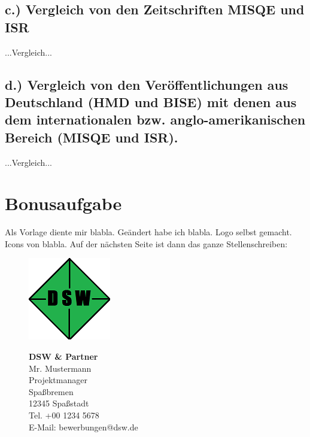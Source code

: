 \documentclass[12pt,utf8]{scrartcl}
\begin{document}
\begin{flushleft}
\subsection{\label{sub3:einfuehrung}c.) Vergleich von den Zeitschriften MISQE und ISR}

...Vergleich...

\subsection{\label{sub4:einfuehrung}d.) Vergleich von den Veröffentlichungen aus Deutschland (HMD und BISE) mit denen aus dem internationalen bzw. anglo-amerikanischen Bereich (MISQE und ISR).}

...Vergleich...

\section{\label{sec:bonus}Bonusaufgabe}

Als Vorlage diente mir \cite{online1}  blabla. Geändert habe ich blabla. Logo selbst gemacht.
Icons von blabla\cite{online2}. Auf der nächsten Seite ist dann das ganze Stellenschreiben:

\newpage
\begin{figure}[htbp]
	\begin{minipage}[t]{4cm}
		\vspace{0pt}
		\centering
		\includegraphics{images/Logo}
		\label{fig:Logo}
	\end{minipage}
	\hfill
	\begin{minipage}[t]{4cm}
		\vspace{0pt}
		\scriptsize
		\textbf{DSW \& Partner}\\
		Mr. Mustermann\\
		Projektmanager\\
		Spaßbremen\\
		12345 Spaßstadt\\
		Tel. +00 1234 5678 \\
		E-Mail: bewerbungen@dsw.de
	\end{minipage}
\end{figure}
			

\end{flushleft}
\end{document}
